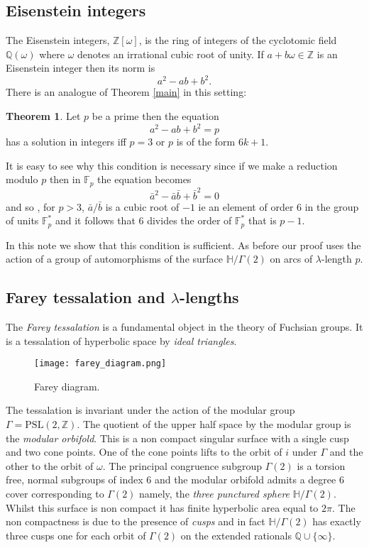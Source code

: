 \documentclass[12pt]{amsart}
\theoremstyle{plain}
\theoremstyle{definition}
\newtheorem{thm}{Theorem}[section]
\def\HH{\mathbb{H}}
\def\xx{\HH/g2}
\def\ZZ{\mathbb{Z}}
\def\QQ{\mathbb{Q}}
\def\fp{\mathbb{F}_p}
\def\sl2{\mathrm{SL}(2, \ZZ)}
\def\g2{\Gamma(2)}
\def\xx{\HH/\g2}
\begin{document}
\subsection{Eisenstein integers}

The Eisenstein integers, $\ZZ[\omega]$,
is  the ring of integers of the cyclotomic field $\QQ(\omega)$
where $\omega$ denotes  an irrational cubic root of unity.
If $a + b\omega \in \ZZ$ is  an Eisenstein integer then its norm is
$$a^2 - ab  + b^2.$$
There is an analogue of Theorem \ref{main} in this setting:

\begin{thm}\label{eisenstein}
Let $p$ be a prime then the equation
\begin{equation}\label{eisenstein norm}
a^2 - ab + b^2 = p 
\end{equation}
has a solution in integers  iff  $p =3$ or $p$ is of the form $6k + 1$.
\end{thm}

It is easy to see why this condition is necessary since 
if we make a reduction modulo $p$ then  in $\fp$
the  equation  becomes
$$\bar{a}^2 -  \bar{a}\bar{b} +\bar{ b}^2 = 0$$
and so , for $p> 3$,  $\bar{a}/\bar{b}$ is a
cubic root of $-1$ ie an element of order 6 in the group of units
$\fp^*$
and it follows that 6 divides 
the order of $\fp^*$  
that is $p-1$.

In this note we show that this  condition is sufficient.
As before our  proof uses the action  
of a group of automorphisms of  the surface $\xx$ on
arcs of $\lambda$-length $p$.


\subsection{Farey tessalation and $\lambda$-lengths}

The  \textit{Farey tessalation} is a fundamental object in the theory of Fuchsian groups. It is a tessalation of hyperbolic space by \textit{ideal triangles}.

\begin{figure}[hb]
\begin{center}
\texttt{[image: farey\_diagram.png]} 
\end{center}
\caption{Farey diagram.}
\label{farey diagram}
\end{figure}

The tessalation is invariant under the action of the modular group $\Gamma = \mathrm{P}\sl2$.
The quotient  of the upper half space by the modular group 
is the \textit{modular orbifold}. This is a non compact singular
surface with a single cusp and two cone points. 
One of the cone points lifts to the orbit of $i$  under $\Gamma$ 
and the other to the orbit of $\omega$.
The principal congruence subgroup $\g2$
 is a torsion free, normal subgroups of index 6
and the modular orbifold admits a degree 6 cover
corresponding to $\g2$
namely, the \textit{three punctured sphere} $\HH/\g2$.
Whilst this surface is non compact it has finite hyperbolic area
equal to $2\pi$. The non compactness is due to the presence of
\textit{cusps} and in fact  $\HH/\g2$ has exactly three cusps one for each orbit of $\g2$ on the extended rationals $\QQ \cup \{ \infty \}$.
\end{document}
